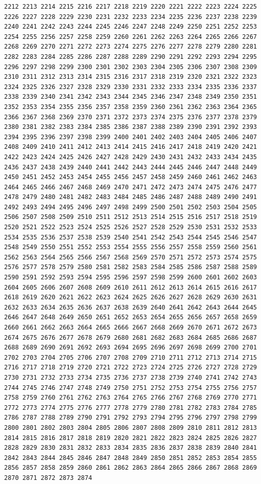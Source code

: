 \documentclass[11pt,]{article}
\begin{document}
\begin{verbatim}
2212 2213 2214 2215 2216 2217 2218 2219 2220 2221 2222 2223 2224 2225 2226 2227 2228 2229 2230 2231 2232 2233 2234 2235 2236 2237 2238 2239 2240 2241 2242 2243 2244 2245 2246 2247 2248 2249 2250 2251 2252 2253 2254 2255 2256 2257 2258 2259 2260 2261 2262 2263 2264 2265 2266 2267 2268 2269 2270 2271 2272 2273 2274 2275 2276 2277 2278 2279 2280 2281 2282 2283 2284 2285 2286 2287 2288 2289 2290 2291 2292 2293 2294 2295 2296 2297 2298 2299 2300 2301 2302 2303 2304 2305 2306 2307 2308 2309 2310 2311 2312 2313 2314 2315 2316 2317 2318 2319 2320 2321 2322 2323 2324 2325 2326 2327 2328 2329 2330 2331 2332 2333 2334 2335 2336 2337 2338 2339 2340 2341 2342 2343 2344 2345 2346 2347 2348 2349 2350 2351 2352 2353 2354 2355 2356 2357 2358 2359 2360 2361 2362 2363 2364 2365 2366 2367 2368 2369 2370 2371 2372 2373 2374 2375 2376 2377 2378 2379 2380 2381 2382 2383 2384 2385 2386 2387 2388 2389 2390 2391 2392 2393 2394 2395 2396 2397 2398 2399 2400 2401 2402 2403 2404 2405 2406 2407 2408 2409 2410 2411 2412 2413 2414 2415 2416 2417 2418 2419 2420 2421 2422 2423 2424 2425 2426 2427 2428 2429 2430 2431 2432 2433 2434 2435 2436 2437 2438 2439 2440 2441 2442 2443 2444 2445 2446 2447 2448 2449 2450 2451 2452 2453 2454 2455 2456 2457 2458 2459 2460 2461 2462 2463 2464 2465 2466 2467 2468 2469 2470 2471 2472 2473 2474 2475 2476 2477 2478 2479 2480 2481 2482 2483 2484 2485 2486 2487 2488 2489 2490 2491 2492 2493 2494 2495 2496 2497 2498 2499 2500 2501 2502 2503 2504 2505 2506 2507 2508 2509 2510 2511 2512 2513 2514 2515 2516 2517 2518 2519 2520 2521 2522 2523 2524 2525 2526 2527 2528 2529 2530 2531 2532 2533 2534 2535 2536 2537 2538 2539 2540 2541 2542 2543 2544 2545 2546 2547 2548 2549 2550 2551 2552 2553 2554 2555 2556 2557 2558 2559 2560 2561 2562 2563 2564 2565 2566 2567 2568 2569 2570 2571 2572 2573 2574 2575 2576 2577 2578 2579 2580 2581 2582 2583 2584 2585 2586 2587 2588 2589 2590 2591 2592 2593 2594 2595 2596 2597 2598 2599 2600 2601 2602 2603 2604 2605 2606 2607 2608 2609 2610 2611 2612 2613 2614 2615 2616 2617 2618 2619 2620 2621 2622 2623 2624 2625 2626 2627 2628 2629 2630 2631 2632 2633 2634 2635 2636 2637 2638 2639 2640 2641 2642 2643 2644 2645 2646 2647 2648 2649 2650 2651 2652 2653 2654 2655 2656 2657 2658 2659 2660 2661 2662 2663 2664 2665 2666 2667 2668 2669 2670 2671 2672 2673 2674 2675 2676 2677 2678 2679 2680 2681 2682 2683 2684 2685 2686 2687 2688 2689 2690 2691 2692 2693 2694 2695 2696 2697 2698 2699 2700 2701 2702 2703 2704 2705 2706 2707 2708 2709 2710 2711 2712 2713 2714 2715 2716 2717 2718 2719 2720 2721 2722 2723 2724 2725 2726 2727 2728 2729 2730 2731 2732 2733 2734 2735 2736 2737 2738 2739 2740 2741 2742 2743 2744 2745 2746 2747 2748 2749 2750 2751 2752 2753 2754 2755 2756 2757 2758 2759 2760 2761 2762 2763 2764 2765 2766 2767 2768 2769 2770 2771 2772 2773 2774 2775 2776 2777 2778 2779 2780 2781 2782 2783 2784 2785 2786 2787 2788 2789 2790 2791 2792 2793 2794 2795 2796 2797 2798 2799 2800 2801 2802 2803 2804 2805 2806 2807 2808 2809 2810 2811 2812 2813 2814 2815 2816 2817 2818 2819 2820 2821 2822 2823 2824 2825 2826 2827 2828 2829 2830 2831 2832 2833 2834 2835 2836 2837 2838 2839 2840 2841 2842 2843 2844 2845 2846 2847 2848 2849 2850 2851 2852 2853 2854 2855 2856 2857 2858 2859 2860 2861 2862 2863 2864 2865 2866 2867 2868 2869 2870 2871 2872 2873 2874 
\end{verbatim}
\end{document}
